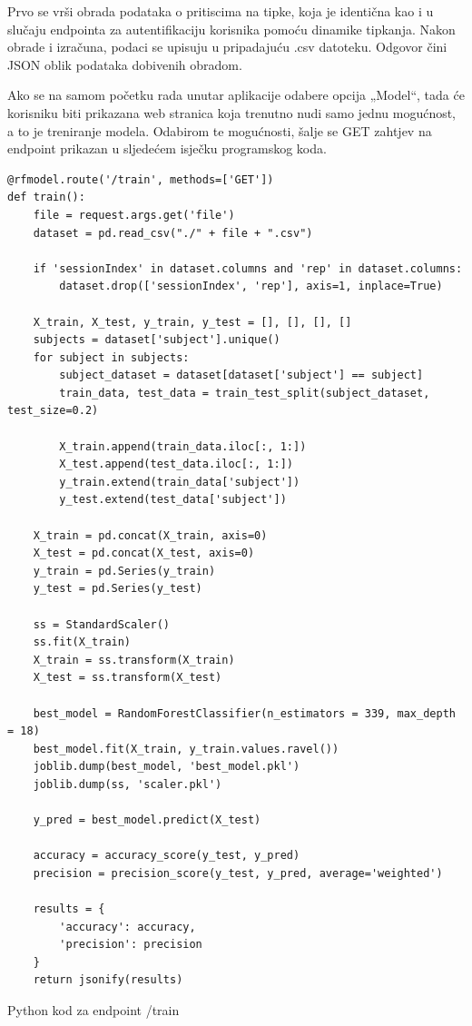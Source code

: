 \documentclass[]{foi}
\begin{document}
Prvo se vrši obrada podataka o pritiscima na tipke, koja je identična kao i u slučaju endpointa za autentifikaciju korisnika pomoću dinamike tipkanja. Nakon obrade i izračuna, podaci se upisuju u pripadajuću .csv datoteku. Odgovor čini JSON oblik podataka dobivenih obradom. 

Ako se na samom početku rada unutar aplikacije odabere opcija „Model“, tada će korisniku biti prikazana web stranica koja trenutno nudi samo jednu mogućnost, a to je treniranje modela. Odabirom te mogućnosti, šalje se GET zahtjev na endpoint prikazan u sljedećem isječku programskog koda.

\begin{longlisting}
\begin{verbatim}
@rfmodel.route('/train', methods=['GET'])
def train():
    file = request.args.get('file')
    dataset = pd.read_csv("./" + file + ".csv")
    
    if 'sessionIndex' in dataset.columns and 'rep' in dataset.columns:
        dataset.drop(['sessionIndex', 'rep'], axis=1, inplace=True)

    X_train, X_test, y_train, y_test = [], [], [], []
    subjects = dataset['subject'].unique()
    for subject in subjects:
        subject_dataset = dataset[dataset['subject'] == subject]
        train_data, test_data = train_test_split(subject_dataset, test_size=0.2)
        
        X_train.append(train_data.iloc[:, 1:])
        X_test.append(test_data.iloc[:, 1:])
        y_train.extend(train_data['subject'])
        y_test.extend(test_data['subject'])

    X_train = pd.concat(X_train, axis=0)
    X_test = pd.concat(X_test, axis=0)
    y_train = pd.Series(y_train)
    y_test = pd.Series(y_test)

    ss = StandardScaler()
    ss.fit(X_train)
    X_train = ss.transform(X_train)
    X_test = ss.transform(X_test)

    best_model = RandomForestClassifier(n_estimators = 339, max_depth = 18)
    best_model.fit(X_train, y_train.values.ravel())
    joblib.dump(best_model, 'best_model.pkl')
    joblib.dump(ss, 'scaler.pkl')

    y_pred = best_model.predict(X_test)

    accuracy = accuracy_score(y_test, y_pred)
    precision = precision_score(y_test, y_pred, average='weighted')

    results = {
        'accuracy': accuracy,
        'precision': precision
    }
    return jsonify(results)
\end{verbatim}
\caption{Python kod za endpoint /train}
\label{lst:python_train}
\end{longlisting}
\end{document}
